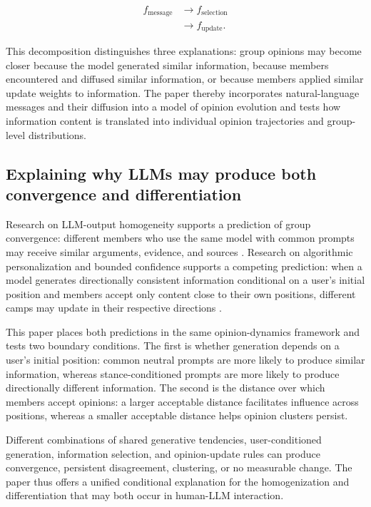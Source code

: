 \documentclass[11pt,a4paper]{article}
\begin{document}
\begin{equation*}
\begin{aligned}f_{\text{message}} &\rightarrow f_{\text{selection}} \\
&\rightarrow f_{\text{update}}.\end{aligned}
\end{equation*}

This decomposition distinguishes three explanations: group opinions may become closer because the model generated similar information, because members encountered and diffused similar information, or because members applied similar update weights to information. The paper thereby incorporates natural-language messages and their diffusion into a model of opinion evolution and tests how information content is translated into individual opinion trajectories and group-level distributions.

\subsection{Explaining why LLMs may produce both convergence and differentiation}

Research on LLM-output homogeneity supports a prediction of group convergence: different members who use the same model with common prompts may receive similar arguments, evidence, and sources \cite{jiang2025}. Research on algorithmic personalization and bounded confidence supports a competing prediction: when a model generates directionally consistent information conditional on a user's initial position and members accept only content close to their own positions, different camps may update in their respective directions \cite{perra2019,hegselmann2002}.

This paper places both predictions in the same opinion-dynamics framework and tests two boundary conditions. The first is whether generation depends on a user's initial position: common neutral prompts are more likely to produce similar information, whereas stance-conditioned prompts are more likely to produce directionally different information. The second is the distance over which members accept opinions: a larger acceptable distance facilitates influence across positions, whereas a smaller acceptable distance helps opinion clusters persist.

Different combinations of shared generative tendencies, user-conditioned generation, information selection, and opinion-update rules can produce convergence, persistent disagreement, clustering, or no measurable change. The paper thus offers a unified conditional explanation for the homogenization and differentiation that may both occur in human-LLM interaction.
\end{document}
